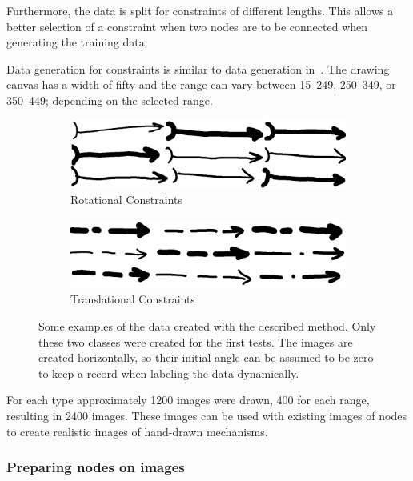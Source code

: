 Furthermore, the data is split for constraints of different lengths.
This allows a better selection of a constraint when two nodes are to be connected when generating the training data.

Data generation for constraints is similar to data generation in~\cite{Lawrence2020}.
The drawing canvas has a width of fifty and the range can vary between 15--249, 250--349, or 350--449; depending on the selected range.

\begin{figure}
    \centering
    \begin{subfigure}[b]{0.45\textwidth}
        \includegraphics[width=\textwidth]{images/rs.png}
        \caption{Rotational Constraints}\label{fig:rotational_constraints}
    \end{subfigure}
    \begin{subfigure}[b]{0.45\textwidth}
        \includegraphics[width=\textwidth]{images/ts.png}
        \caption{Translational Constraints}\label{fig:translational_constraints}
    \end{subfigure}
    \caption[Examples of constraint detector training data]{Some examples of the data created with the described method. Only these two classes were created for the first tests. The images are created horizontally, so their initial angle can be assumed to be zero to keep a record when labeling the data dynamically. }\label{fig:constraint_data}
\end{figure}

For each type approximately 1200 images were drawn, 400 for each range, resulting in 2400 images. %
These images can be used with existing images of nodes to create realistic images of hand-drawn mechanisms.

\subsubsection{Preparing nodes on images}

